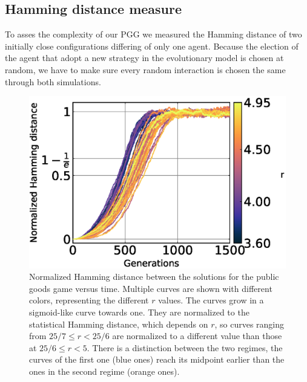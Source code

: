 \subsection{Hamming distance measure}


To asses the complexity of our PGG we measured the Hamming distance of two initially close configurations differing of only one agent. Because the election of the agent that adopt a new strategy in the evolutionary model is chosen at random, we have to make sure every random interaction is chosen the same through both simulations.



\begin{figure}
	\centering
	\includegraphics[width=1\linewidth]{Images/P3/NormalHammingTimePopulation_r.eps}
	\caption{Normalized Hamming distance between the solutions for the public goods game versus time. Multiple curves are shown with different colors, representing the different $r$ values. The curves grow in a sigmoid-like curve towards one. They are normalized to the statistical Hamming distance, which depends on $r$, so curves ranging from  $25/7\leq r<25/6$ are normalized to a different value than those at $25/6\leq r<5$. There is a distinction between the two regimes, the curves of the first one (blue ones) reach its midpoint earlier than the ones in the second regime (orange ones).}
	\label{fig:NormalHammingTimePopulation_r}
\end{figure}



